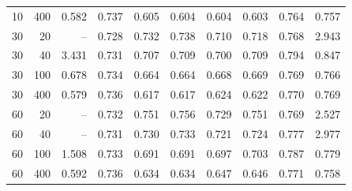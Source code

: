 \begin{tabular}{@{}rrrrrrrrrr@{}}
10 & 400 & 0.582 & 0.737 & 0.605 & 0.604 & 0.604 & 0.603 & 0.764 & 0.757 \\
30 & 20 & -- & 0.728 & 0.732 & 0.738 & 0.710 & 0.718 & 0.768 & 2.943 \\
30 & 40 & 3.431 & 0.731 & 0.707 & 0.709 & 0.700 & 0.709 & 0.794 & 0.847 \\
30 & 100 & 0.678 & 0.734 & 0.664 & 0.664 & 0.668 & 0.669 & 0.769 & 0.766 \\
30 & 400 & 0.579 & 0.736 & 0.617 & 0.617 & 0.624 & 0.622 & 0.770 & 0.769 \\
60 & 20 & -- & 0.732 & 0.751 & 0.756 & 0.729 & 0.751 & 0.769 & 2.527 \\
60 & 40 & -- & 0.731 & 0.730 & 0.733 & 0.721 & 0.724 & 0.777 & 2.977 \\
60 & 100 & 1.508 & 0.733 & 0.691 & 0.691 & 0.697 & 0.703 & 0.787 & 0.779 \\
60 & 400 & 0.592 & 0.736 & 0.634 & 0.634 & 0.647 & 0.646 & 0.771 & 0.758 \\
\bottomrule
\end{tabular}